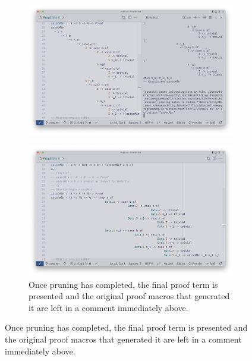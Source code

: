 \begin{figure}
\begin{subfigure}[t][][t]{1\textwidth}
\begin{minipage}[c]{0.3\textwidth}
    \end{minipage}
    \hfill
    \begin{minipage}[c]{0.63\textwidth}
      \includegraphics[width=\textwidth]{example-screenshots/pruning.png}
    \end{minipage}
  \end{subfigure}
  \begin{subfigure}[t][][t]{1\textwidth}
    \begin{minipage}[c]{0.63\textwidth}
      \includegraphics[width=\textwidth]{example-screenshots/done.png}
    \end{minipage}
    \hfill
    \begin{minipage}[c]{0.3\textwidth}
      \caption{Once pruning has completed, the final proof term is presented and
      the original proof macros that generated it are left in a comment 
      immediately above.}    \end{minipage}
  \end{subfigure}

\end{figure}
